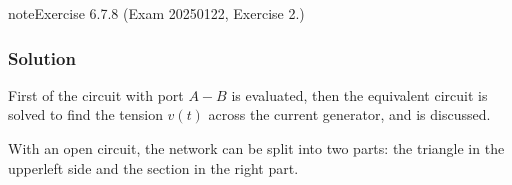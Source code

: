 \documentclass[letterpaper,10pt,english]{jupyterBook}
\begin{document}
\begin{sphinxadmonition}{note}{Exercise 6.7.8 (Exam 2025\sphinxhyphen{}01\sphinxhyphen{}22, Exercise 2.)}



\begin{figure}[htbp]
\centering

\noindent{}
\end{figure}
\subsubsection*{Solution}

\sphinxAtStartPar
First {\hyperref[\detokenize{ch/electrical-engineering-networks:classical-electromagnetism-electrical-engineering-newtork-analysis-thevenin-1-port}]{}} of the circuit with port \(A-B\) is evaluated, then the equivalent circuit is solved to find the tension \(v(t)\) across the current generator, and {\hyperref[\detokenize{ch/electrical-engineering-networks-harmonic:classical-electromagnetism-electrical-engineering-newtork-analysis-harmonic-power}]{}} is discussed.

\sphinxAtStartPar
{} With an open circuit, the network can be split into two parts: the triangle in the upper\sphinxhyphen{}left side and the section in the right part.


\end{sphinxadmonition}
\end{document}
